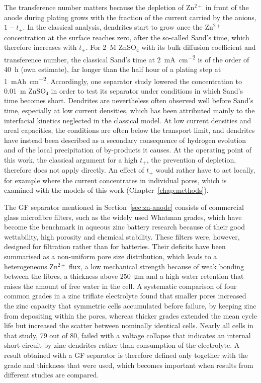 The transference number matters because the depletion of Zn$^{2+}$ in front of the anode during plating grows with the fraction of the current carried by the anions, $1-t_+$\cite{yang_dendrite_2025}.
In the classical analysis, dendrites start to grow once the Zn$^{2+}$ concentration at the surface reaches zero, after the so-called Sand's time, which therefore increases with $t_+$\cite{yang_dendrite_2025}.
For \SI{2}{M} ZnSO$_4$ with its bulk diffusion coefficient\cite{albright_mutual_1975} and transference number\cite{purser_transference_1951}, the classical Sand's time at \SI{2}{mA.cm^{-2}} is of the order of \SI{40}{h} (own estimate), far longer than the half hour of a plating step at \SI{1}{mAh.cm^{-2}}.
Accordingly, one separator study lowered the concentration to \SI{0.01}{m} ZnSO$_4$ in order to test its separator under conditions in which Sand's time becomes short\cite{su_printingscalable_2022}.
Dendrites are nevertheless often observed well before Sand's time, especially at low current densities, which has been attributed mainly to the interfacial kinetics neglected in the classical model\cite{yang_dendrite_2025}.
At low current densities and areal capacities, the conditions are often below the transport limit, and dendrites have instead been described as a secondary consequence of hydrogen evolution and of the local precipitation of by-products it causes\cite{rana_electroanalytical_2025}.
At the operating point of this work, the classical argument for a high $t_+$, the prevention of depletion, therefore does not apply directly.
An effect of $t_+$ would rather have to act locally, for example where the current concentrates in individual pores, which is examined with the models of this work (Chapter~\ref{chap:methods}).

The GF separator mentioned in Section~\ref{sec:zn-anode} consists of commercial glass microfibre filters, such as the widely used Whatman grades, which have become the benchmark in aqueous zinc battery research because of their good wettability, high porosity and chemical stability\cite{gu_role_2025}.
These filters were, however, designed for filtration rather than for batteries\cite{gu_role_2025}.
Their deficits have been summarised as a non-uniform pore size distribution, which leads to a heterogeneous Zn$^{2+}$ flux, a low mechanical strength because of weak bonding between the fibres, a thickness above \SI{250}{\um} and a high water retention that raises the amount of free water in the cell\cite{gu_role_2025}.
A systematic comparison of four common grades in a zinc triflate electrolyte found that smaller pores increased the zinc capacity that symmetric cells accumulated before failure, by keeping zinc from depositing within the pores, whereas thicker grades extended the mean cycle life but increased the scatter between nominally identical cells\cite{hansen_role_2023}.
Nearly all cells in that study, 79 out of 80, failed with a voltage collapse that indicates an internal short circuit by zinc dendrites rather than consumption of the electrolyte\cite{hansen_role_2023}.
A result obtained with a GF separator is therefore defined only together with the grade and thickness that were used, which becomes important when results from different studies are compared.

